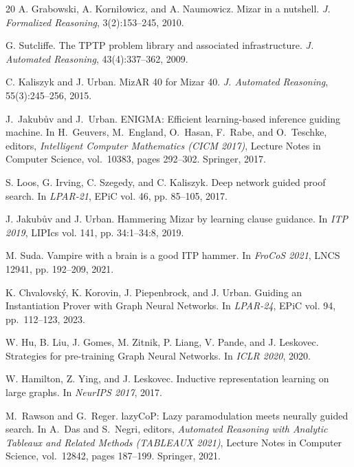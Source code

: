 \documentclass{easychair}
\begin{document}
\begin{thebibliography}{20}
A. Grabowski, A. Korni{\l}owicz, and A. Naumowicz.
\newblock Mizar in a nutshell.
\newblock \emph{J. Formalized Reasoning}, 3(2):153--245, 2010.

G. Sutcliffe.
\newblock The TPTP problem library and associated infrastructure.
\newblock \emph{J. Automated Reasoning}, 43(4):337--362, 2009.

C. Kaliszyk and J. Urban.
\newblock MizAR 40 for Mizar 40.
\newblock \emph{J. Automated Reasoning}, 55(3):245--256, 2015.

J.~Jakub\r{u}v and J.~Urban.
\newblock ENIGMA: Efficient learning-based inference guiding machine.
\newblock In H.~Geuvers, M.~England, O.~Hasan, F.~Rabe, and O.~Teschke, editors,
{\em Intelligent Computer Mathematics (CICM 2017)},
Lecture Notes in Computer Science, vol.~10383,
pages 292--302. Springer, 2017.

S. Loos, G. Irving, C. Szegedy, and C. Kaliszyk.
\newblock Deep network guided proof search.
\newblock In \emph{LPAR-21}, EPiC vol. 46, pp. 85--105, 2017.

J. Jakub\r{u}v and J. Urban.
\newblock Hammering Mizar by learning clause guidance.
\newblock In \emph{ITP 2019}, LIPIcs vol. 141, pp. 34:1--34:8, 2019.

M. Suda.
\newblock Vampire with a brain is a good ITP hammer.
\newblock In \emph{FroCoS 2021}, LNCS 12941, pp. 192--209, 2021.

K. Chvalovsk{\'y}, K. Korovin, J. Piepenbrock, and J. Urban.
\newblock Guiding an Instantiation Prover with Graph Neural Networks.
\newblock In \emph{LPAR-24}, EPiC vol. 94, pp.~112--123, 2023.

W. Hu, B. Liu, J. Gomes, M. Zitnik, P. Liang, V. Pande, and J. Leskovec.  
\newblock Strategies for pre-training Graph Neural Networks.
\newblock In \emph{ICLR 2020}, 2020.


W. Hamilton, Z. Ying, and J. Leskovec.
\newblock Inductive representation learning on large graphs.
\newblock In \emph{NeurIPS 2017}, 2017.

M.~Rawson and G.~Reger.
\newblock lazyCoP: Lazy paramodulation meets neurally guided search.
\newblock In A.~Das and S.~Negri, editors,
{\em Automated Reasoning with Analytic Tableaux and Related Methods
(TABLEAUX 2021)},
Lecture Notes in Computer Science, vol.~12842,
pages 187--199. Springer, 2021.



\end{thebibliography}
\end{document}
